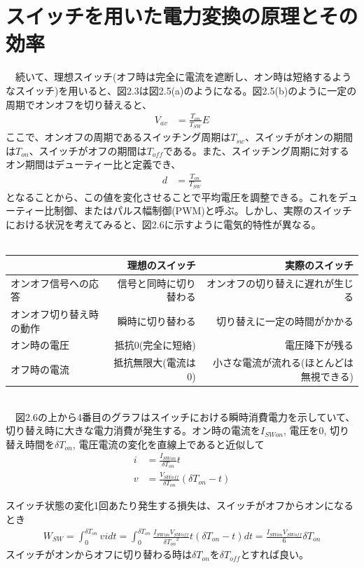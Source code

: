 \documentclass{article}
\begin{document}
\section{スイッチを用いた電力変換の原理とその効率}
　続いて、理想スイッチ(オフ時は完全に電流を遮断し、オン時は短絡するようなスイッチ)を用いると、図2.3は図2.5(a)のようになる。図2.5(b)のように一定の周期でオンオフを切り替えると、
\begin{align}
    V_{av} &= \frac{T_{on}}{T_{SW}}E
\end{align}
ここで、オンオフの周期であるスイッチング周期は\(T_{sw}\)、スイッチがオンの期間は\(T_{on}\)、スイッチがオフの期間は\(T_{off}\)である。また、スイッチング周期に対するオン期間はデューティー比と定義でき、
\begin{align}
    d &= \frac{T_{on}}{T_{SW}}
\end{align}
となることから、この値を変化させることで平均電圧を調整できる。これをデューティー比制御、またはパルス幅制御(PWM)と呼ぶ。しかし、実際のスイッチにおける状況を考えてみると、図2.6に示すように電気的特性が異なる。\\
\\
\begin{tabular}{lrr} \hline
    & 理想のスイッチ & 実際のスイッチ \\ \hline
   オンオフ信号への応答 & 信号と同時に切り替わる & オンオフの切り替えに遅れが生じる\\
   オンオフ切り替え時の動作 & 瞬時に切り替わる & 切り替えに一定の時間がかかる\\
   オン時の電圧 & 抵抗0(完全に短絡) & 電圧降下が残る\\
   オフ時の電流 & 抵抗無限大(電流は0) & 小さな電流が流れる(ほとんどは無視できる)\\ \hline
\end{tabular}
\vspace{1em}
\\
　図2.6の上から4番目のグラフはスイッチにおける瞬時消費電力を示していて、切り替え時に大きな電力消費が発生する。オン時の電流を\(I_{SWon}\), 電圧を0, 切り替え時間を\(\delta T_{on}\), 電圧電流の変化を直線上であると近似して\\
\begin{align}
    i &= \frac{I_{SWon}}{\delta T_{on}}t \\
    v &= \frac{V_{SWoff}}{\delta T_{on}}(\delta T_{on} - t)
\end{align}

スイッチ状態の変化1回あたり発生する損失は、スイッチがオフからオンになるとき
\begin{align}
    W_{SW} = \int_{0}^{\delta T_{on}}vidt = \int_{0}^{\delta T_{on}}\frac{I_{SWon}V_{SWoff}}{\delta {T_{on}}^2}t(\delta T_{on} - t)dt = \frac{I_{SWon}V_{SWoff}}{6}\delta T_{on}
\end{align}
スイッチがオンからオフに切り替わる時は\(\delta T_{on}\)を\(\delta T_{off}\)とすれば良い。
\end{document}
